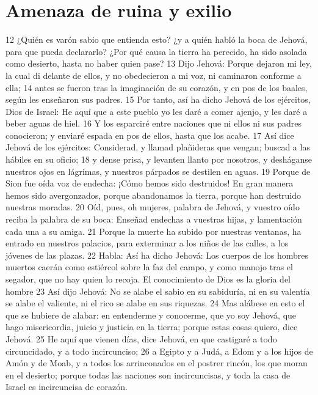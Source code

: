 \section*{Amenaza de ruina y exilio}

12 ¿Quién es varón sabio que entienda esto? ¿y a quién habló la boca de Jehová, para que pueda declararlo? ¿Por qué causa la tierra ha perecido, ha sido asolada como desierto, hasta no haber quien pase?
13 Dijo Jehová: Porque dejaron mi ley, la cual di delante de ellos, y no obedecieron a mi voz, ni caminaron conforme a ella;
14 antes se fueron tras la imaginación de su corazón, y en pos de los baales, según les enseñaron sus padres.
15 Por tanto, así ha dicho Jehová de los ejércitos, Dios de Israel: He aquí que a este pueblo yo les daré a comer ajenjo, y les daré a beber aguas de hiel.
16 Y los esparciré entre naciones que ni ellos ni sus padres conocieron; y enviaré espada en pos de ellos, hasta que los acabe.
17 Así dice Jehová de los ejércitos: Considerad, y llamad plañideras que vengan; buscad a las hábiles en su oficio;
18 y dense prisa, y levanten llanto por nosotros, y desháganse nuestros ojos en lágrimas, y nuestros párpados se destilen en aguas.
19 Porque de Sion fue oída voz de endecha: ¡Cómo hemos sido destruidos! En gran manera hemos sido avergonzados, porque abandonamos la tierra, porque han destruido nuestras moradas.
20 Oíd, pues, oh mujeres, palabra de Jehová, y vuestro oído reciba la palabra de su boca: Enseñad endechas a vuestras hijas, y lamentación cada una a su amiga.
21 Porque la muerte ha subido por nuestras ventanas, ha entrado en nuestros palacios, para exterminar a los niños de las calles, a los jóvenes de las plazas.
22 Habla: Así ha dicho Jehová: Los cuerpos de los hombres muertos caerán como estiércol sobre la faz del campo, y como manojo tras el segador, que no hay quien lo recoja.
El conocimiento de Dios es la gloria del hombre
23 Así dijo Jehová: No se alabe el sabio en su sabiduría, ni en su valentía se alabe el valiente, ni el rico se alabe en sus riquezas.
24 Mas alábese en esto el que se hubiere de alabar: en entenderme y conocerme, que yo soy Jehová, que hago misericordia, juicio y justicia en la tierra; porque estas cosas quiero, dice Jehová.
25 He aquí que vienen días, dice Jehová, en que castigaré a todo circuncidado, y a todo incircunciso;
26 a Egipto y a Judá, a Edom y a los hijos de Amón y de Moab, y a todos los arrinconados en el postrer rincón, los que moran en el desierto; porque todas las naciones son incircuncisas, y toda la casa de Israel es incircuncisa de corazón.

